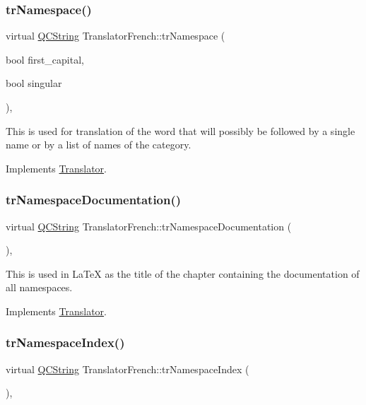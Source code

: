 \subsubsection{\texorpdfstring{trNamespace()}{trNamespace()}}
{\footnotesize\ttfamily virtual \mbox{\hyperlink{class_q_c_string}{Q\+C\+String}} Translator\+French\+::tr\+Namespace (\begin{DoxyParamCaption}\item[{bool}]{first\+\_\+capital,  }\item[{bool}]{singular }\end{DoxyParamCaption})\hspace{0.3cm}{\ttfamily [inline]}, {\ttfamily [virtual]}}

This is used for translation of the word that will possibly be followed by a single name or by a list of names of the category. 

Implements \mbox{\hyperlink{class_translator}{Translator}}.

\mbox{\label{class_translator_french_ac76b7982e1e144739ccedc23f9004387}} 
\subsubsection{\texorpdfstring{trNamespaceDocumentation()}{trNamespaceDocumentation()}}
{\footnotesize\ttfamily virtual \mbox{\hyperlink{class_q_c_string}{Q\+C\+String}} Translator\+French\+::tr\+Namespace\+Documentation (\begin{DoxyParamCaption}{ }\end{DoxyParamCaption})\hspace{0.3cm}{\ttfamily [inline]}, {\ttfamily [virtual]}}

This is used in La\+TeX as the title of the chapter containing the documentation of all namespaces. 

Implements \mbox{\hyperlink{class_translator}{Translator}}.

\mbox{\label{class_translator_french_abc9d03053bf85fccb429f5182b83c67d}} 
\subsubsection{\texorpdfstring{trNamespaceIndex()}{trNamespaceIndex()}}
{\footnotesize\ttfamily virtual \mbox{\hyperlink{class_q_c_string}{Q\+C\+String}} Translator\+French\+::tr\+Namespace\+Index (\begin{DoxyParamCaption}{ }\end{DoxyParamCaption})\hspace{0.3cm}{\ttfamily [inline]}, {\ttfamily [virtual]}}

